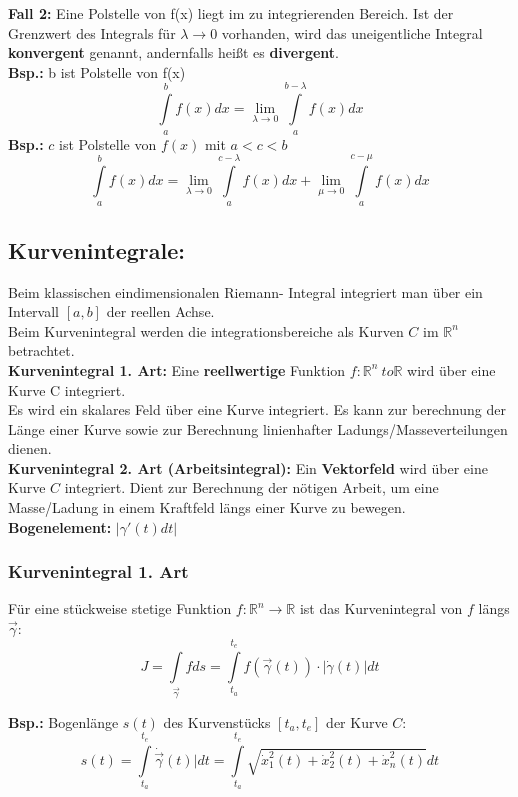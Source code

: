 \textbf{Fall 2:}
Eine Polstelle von f(x) liegt im zu integrierenden Bereich. Ist der Grenzwert des Integrals für $\lambda \to 0$ vorhanden, wird das uneigentliche Integral \textbf{konvergent} genannt, andernfalls heißt es \textbf{divergent}.\\
\textbf{Bsp.:} b ist Polstelle von f(x)\\
\[\int\limits_a^b f(x)dx=\lim\limits_{\lambda \to 0}\int\limits_a^{b-\lambda}f(x)dx\]
\textbf{Bsp.:} $c$ ist Polstelle von $f(x)$ mit $a<c<b$
\[\int\limits_a^b f(x) dx = \lim\limits_{\lambda \to 0}\int\limits_a^{c-\lambda}f(x)dx + \lim\limits_{\mu \to 0}\int\limits_a^{c-\mu}f(x)dx\]


\subsection{Kurvenintegrale:}
Beim klassischen eindimensionalen Riemann- Integral integriert man über ein Intervall $[a,b]$ der reellen Achse.\\
Beim Kurvenintegral werden die integrationsbereiche als Kurven $C$ im $\mathbb{R}^n$ betrachtet.\\
\textbf{Kurvenintegral 1. Art:} Eine \textbf{reellwertige} Funktion $f:\mathbb{R}^n \ to \mathbb{R}$ wird über eine Kurve C integriert.\\
Es wird ein skalares Feld über eine Kurve integriert. Es kann zur berechnung der Länge einer Kurve sowie zur Berechnung linienhafter Ladungs/Masseverteilungen dienen.\\
\textbf{Kurvenintegral 2. Art (Arbeitsintegral):} Ein \textbf{Vektorfeld} wird über eine Kurve $C$ integriert. Dient zur Berechnung der nötigen Arbeit, um eine Masse/Ladung in einem Kraftfeld längs einer Kurve zu bewegen.\\

\textbf{Bogenelement:} $|\gamma'(t)dt|$\\

\subsubsection{Kurvenintegral 1. Art}
Für eine stückweise stetige Funktion $f:\mathbb{R}^n \to \mathbb{R}$ ist das Kurvenintegral von $f$ längs $\vec{\gamma}$: 
$$J=\int\limits_{\vec{\gamma}} fds = \int\limits_{t_a}^{t_e}f(\vec{\gamma} (t))\cdot |\dot{\gamma}(t)|dt$$

\textbf{Bsp.:} Bogenlänge $s(t)$ des Kurvenstücks $[t_a,t_e]$ der Kurve $C$:
\[s(t)=\int\limits_{t_a}^{t_e}\dot{\vec{\gamma}}(t)|dt= \int\limits_{t_a}^{t_e}\sqrt{\dot{x}_1^2(t) + \dot{x}_2^2(t) + \dot{x}_n^2(t)}dt\]

